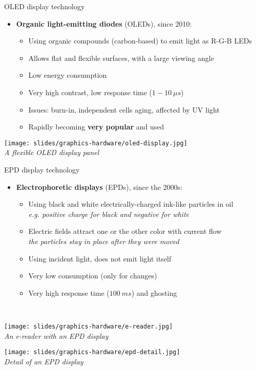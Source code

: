 \begin{frame}{OLED display technology}
  \begin{itemize}
  \item \textbf{Organic light-emitting diodes} (OLEDs), since 2010:
    \begin{itemize}
    \item Using organic compounds (carbon-based) to emit light as R-G-B LEDs
    \item Allows flat and flexible surfaces, with a large viewing angle
    \item Low energy consumption
    \item Very high contrast, low response time (\(1-10~\mu s\))
    \item Issues: burn-in, independent cells aging, affected by UV light
    \item Rapidly becoming \textbf{very popular} and used
    \end{itemize}
  \end{itemize}

  \begin{center}
  \texttt{[image: slides/graphics-hardware/oled-display.jpg]}\\
  \textit{\small A flexible OLED display panel}
  \end{center}
\end{frame}

\begin{frame}{EPD display technology}
  \begin{itemize}
  \item \textbf{Electrophoretic displays} (EPDs), since the 2000s:
    \begin{itemize}
    \item Using black and white electrically-charged ink-like particles in oil\\
    \textit{e.g. positive charge for black and negative for white}
    \item Electric fields attract one or the other color with current flow\\
    \textit{the particles stay in place after they were moved}
    \item Using incident light, does not emit light itself
    \item Very low consumption (only for changes)
    \item Very high response time (\(100~ms\)) and ghosting
    \end{itemize}
  \end{itemize}~

  \begin{minipage}[b]{0.45\textwidth}
    \centering
    \texttt{[image: slides/graphics-hardware/e-reader.jpg]}\\
    \textit{\small An e-reader with an EPD display}
  \end{minipage}
  \hfill
  \begin{minipage}[b]{0.45\textwidth}
    \centering
    \texttt{[image: slides/graphics-hardware/epd-detail.jpg]}\\
    \textit{\small Detail of an EPD display}
  \end{minipage}
\end{frame}

